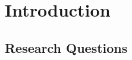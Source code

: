 \chapter{Introduction}
\label{ch:introduction}


\section{Research Questions}
\label{sec:onderzoeksvragen}

